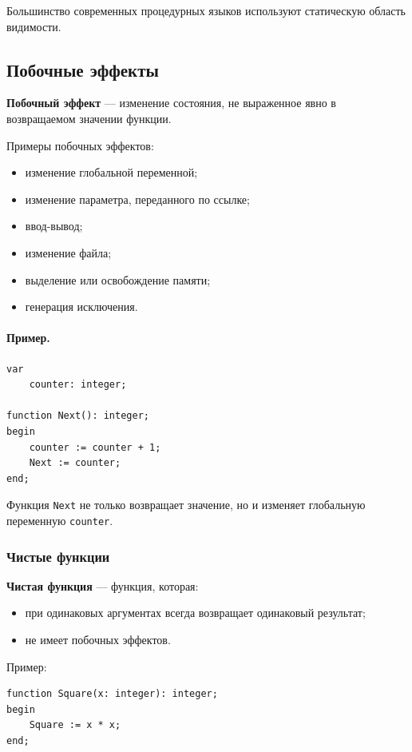 \documentclass[12pt,a4paper]{article}
\begin{document}
Большинство современных процедурных языков используют статическую область видимости.

\subsection{Побочные эффекты}

\textbf{Побочный эффект} --- изменение состояния, не выраженное явно в возвращаемом значении функции.

Примеры побочных эффектов:
\begin{itemize}
    \item изменение глобальной переменной;
    \item изменение параметра, переданного по ссылке;
    \item ввод-вывод;
    \item изменение файла;
    \item выделение или освобождение памяти;
    \item генерация исключения.
\end{itemize}

\paragraph{Пример.}

\begin{verbatim}
var
    counter: integer;

function Next(): integer;
begin
    counter := counter + 1;
    Next := counter;
end;
\end{verbatim}

Функция \texttt{Next} не только возвращает значение, но и изменяет глобальную переменную \texttt{counter}.

\subsubsection{Чистые функции}

\textbf{Чистая функция} --- функция, которая:
\begin{itemize}
    \item при одинаковых аргументах всегда возвращает одинаковый результат;
    \item не имеет побочных эффектов.
\end{itemize}

Пример:

\begin{verbatim}
function Square(x: integer): integer;
begin
    Square := x * x;
end;
\end{verbatim}
\end{document}
